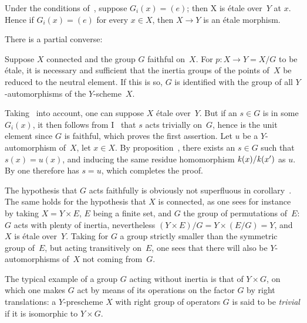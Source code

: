\begin{corollary}
\label{V.2.3}
Under
the conditions of~, suppose $G_i(x)=(e)$; then X
is \'etale over~$Y$ at $x$. Hence if $G_i(x)=(e)$ for every $x \in
X$, then $X \to Y$ is an \'etale morphism.
\end{corollary}

There is a partial converse:

\begin{corollary}
\label{V.2.4} Suppose $X$ connected and the group $G$ faithful
on~$X$. For $p \colon X \to Y=X/G$ to be \'etale, it is necessary and
sufficient that the inertia groups of the points of~$X$ be reduced
to the neutral element. If this is so, $G$ is identified with the
group of all $Y$-automorphisms of the $Y$-scheme~$X$.
\end{corollary}

Taking~ into account, one can suppose $X$ \'etale over~$Y$. But if an $s \in G$ is in some $G_i(x)$, it then follows
from I~ that $s$ acts trivially on~$G$, hence is
the unit element since $G$ is faithful, which proves
the first assertion. Let $u$ be a $Y$-automorphism of~$X$, let
$x \in X$. By proposition~, there exists an $s \in
G$ such that $s(x)=u(x)$, and inducing the same residue
homomorphism
$\mathit{k}(x)/\mathit{k}(x')$
as $u$. By \loccit one therefore has
$s=u$, which completes the proof.

\begin{remark}
\label{V.2.5}
The hypothesis that $G$ acts faithfully is obviously
not superfluous in corollary~. The same holds
for the hypothesis that $X$ is connected, as one sees for instance by
taking $X=Y \times E$, $E$ being a finite set, and $G$ the
group of permutations of~$E$: $G$ acts with plenty of inertia,
nevertheless $(Y \times E)/G=Y \times (E/G)=Y$, and $X$ is \'etale
over~$Y$. Taking for $G$ a group strictly smaller than the
symmetric group of~$E$, but acting transitively on~$E$,
one sees that there will also be $Y$-automorphisms of~$X$ not coming
from~$G$.
\end{remark}

The typical example of a group $G$ acting without inertia is that of
$Y \times G$, on which one makes $G$ act by means of its
operations on the factor $G$ by right translations: a
$Y$-prescheme $X$ with right group of operators
$G$ is said to be \emph{trivial} if it is isomorphic to $Y \times G$.

